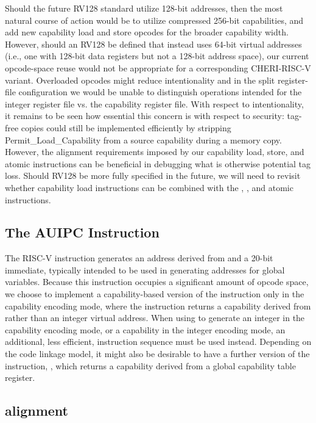 Should the future RV128 standard utilize 128-bit addresses, then the most
natural course of action would be to utilize compressed 256-bit capabilities,
and add new capability load and store opcodes for the broader capability
width.
However, should an RV128 be defined that instead uses 64-bit virtual
addresses (i.e., one with 128-bit data registers but not a 128-bit address
space), our current opcode-space reuse would not be appropriate for a
corresponding CHERI-RISC-V variant.
Overloaded opcodes might reduce intentionality and in the split register-file
configuration we would be unable to distinguish operations intended for the
integer register file vs. the capability register file.
With respect to intentionality, it remains to be seen how essential this
concern is with respect to security: tag-free copies could still be
implemented efficiently by stripping Permit\_Load\_Capability from a source
capability during a memory copy.
However, the alignment requirements imposed by our capability load, store,
and atomic instructions can be beneficial in debugging what is otherwise
potential tag loss.
Should RV128 be more fully specified in the future, we will need to revisit
whether capability load instructions can be combined with the
, , and atomic instructions.

\subsection{The AUIPC Instruction}
\label{section:cheri-risc-v-auipc}

The RISC-V  instruction generates an address derived
from \PC{} and a 20-bit immediate, typically intended to be used in generating
addresses for global variables.
Because this instruction occupies a significant amount of opcode space, we
choose to implement a capability-based version of the instruction only in the
capability encoding mode, where the instruction returns a capability derived
from \PCC{} rather than an integer virtual address.
When using  to generate an integer in the capability
encoding mode, or a capability in the integer encoding mode, an additional,
less efficient, instruction sequence must be used instead.
Depending on the code linkage model, it might also be desirable to have a
further version of the instruction, , which returns
a capability derived from a global capability table register.

\subsection{\PCC{} alignment}
\label{section:cheri-risc-v-pcc-align}


